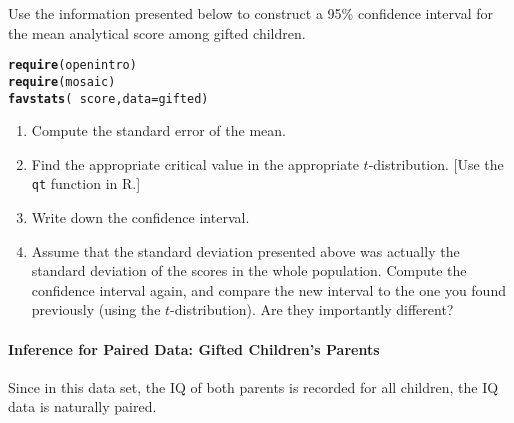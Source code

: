 \documentclass[10pt]{article}\usepackage[]{graphicx}\usepackage[]{color}
\makeatletter
\newcommand{\hlopt}[1]{\textcolor[rgb]{0,0,0}{#1}}%
\newcommand{\hlstd}[1]{\textcolor[rgb]{0.345,0.345,0.345}{#1}}%
\newcommand{\hlkwc}[1]{\textcolor[rgb]{0.333,0.667,0.333}{#1}}%
\newcommand{\hlkwd}[1]{\textcolor[rgb]{0.737,0.353,0.396}{\textbf{#1}}}%
\newenvironment{kframe}{%
 \def\at@end@of@kframe{}%
 \ifinner\ifhmode%
  \def\at@end@of@kframe{\end{minipage}}%
  \begin{minipage}{\columnwidth}%
 \fi\fi%
 \def\FrameCommand##1{\hskip\@totalleftmargin \hskip-\fboxsep
 \colorbox{shadecolor}{##1}\hskip-\fboxsep
     \hskip-\linewidth \hskip-\@totalleftmargin \hskip\columnwidth}%
 \MakeFramed {\advance\hsize-\width
   \@totalleftmargin\z@ \linewidth\hsize
   \@setminipage}}%
 {\par\unskip\endMakeFramed%
 \at@end@of@kframe}
\newenvironment{knitrout}{}{} %
\newcommand{\R}{{\sf R}\xspace}
\newcommand{\cmd}[1]{\texttt{#1}}
\makeatother
\begin{document}
Use the information presented below to construct a 95\% confidence interval for the mean analytical score among gifted children. 

\begin{knitrout}
\color{fgcolor}\begin{kframe}
\begin{alltt}
\hlkwd{require}\hlstd{(openintro)}
\hlkwd{require}\hlstd{(mosaic)}
\hlkwd{favstats}\hlstd{(}\hlopt{~}\hlstd{score,} \hlkwc{data} \hlstd{= gifted)}
\end{alltt}


{\ttfamily\noindent\bfseries{}}\end{kframe}
\end{knitrout}

\begin{enumerate}
  \itemsep1.2in
  \item Compute the standard error of the mean.
  \item Find the appropriate critical value in the appropriate $t$-distribution. [Use the \cmd{qt} function in \R.]
  \item Write down the confidence interval.
  \item Assume that the standard deviation presented above was actually the standard deviation of the scores in the whole population. Compute the confidence interval again, and compare the new interval to the one you found previously (using the $t$-distribution). Are they importantly different? 
\end{enumerate}

  \vspace{1in}

\paragraph{Inference for Paired Data: Gifted Children's Parents}

Since in this data set, the IQ of both parents is recorded for all children, the IQ data is naturally paired. 
\end{document}
